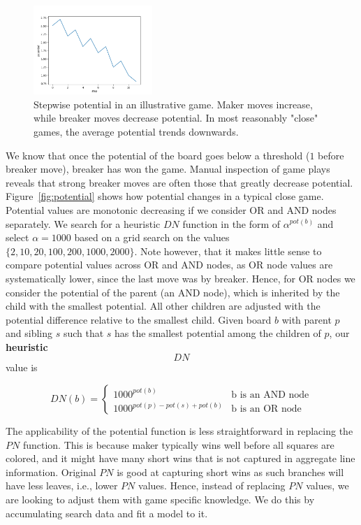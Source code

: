 \documentclass[conference]{IEEEtran}
\theoremstyle{definition}
\newcommand{\pn}{$PN$\xspace}
\newcommand{\dn}{$DN$\xspace}
\begin{document}
\begin{figure}
    \vspace{-20pt}
    \centering
    \includegraphics[width=0.4\textwidth]{papers/cog2021/figures/potential.png}
    \caption{Stepwise potential in an illustrative game. Maker moves increase, while breaker moves decrease potential. In most reasonably "close" games, the average potential trends downwards.}
    \label{fig:potencial}
    \vspace{-10pt}
\end{figure}

We know that once the potential of the board goes below a threshold ($1$ before breaker move), breaker has won the game. Manual inspection of game plays reveals that strong breaker moves are often those that greatly decrease potential. Figure~\ref{fig:potential} shows how potential changes in a typical close game. Potential values are monotonic decreasing if we consider OR and AND nodes separately. We search for a heuristic \dn function in the form of $\alpha^{pot(b)}$ and select $\alpha = 1000$ based on a grid search on the values $\{2, 10, 20, 100, 200, 1000, 2000\}$. Note however, that it makes little sense to compare potential values across OR and AND nodes, as OR node values are systematically lower, since the last move was by breaker. Hence, for OR nodes we consider the potential of the parent (an AND node), which is inherited by the child with the smallest potential. All other children are adjusted with the potential difference relative to the smallest child. Given board $b$ with parent $p$ and sibling $s$ such that $s$ has the smallest potential among the children of $p$, our {\bf heuristic $\dn$} value is

$$
DN(b) =
\left\{
	\begin{array}{ll}
		1000^{pot(b)} & \mbox{b is an AND node}\\
		1000^{pot(p) - pot(s) + pot(b)}  & \mbox{b is an OR node}
	\end{array}
\right.
$$

The applicability of the potential function is less straightforward in replacing the \pn function. This is because maker typically wins well before all squares are colored, and it might have many short wins that is not captured in aggregate line information. Original \pn is good at capturing short wins as such branches will have less leaves, i.e., lower \pn values. Hence, instead of replacing \pn values, we are looking to adjust them with game specific knowledge. We do this by accumulating search data and fit a model to it. 
\end{document}
